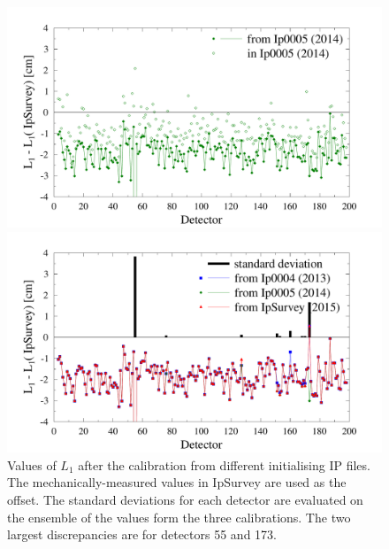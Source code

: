 \documentclass[11pt,a4paper,oneside]{article}
\begin{document}
\begin{figure}
\centering
\includegraphics[width=\textwidth]{img/L1_bis}

\includegraphics[width=\textwidth]{img/L1}
\caption{Values of $L_1$ after the calibration from different initialising IP files. The mechanically-measured values in IpSurvey are used as the offset. The standard deviations for each detector are evaluated on the ensemble of the values form the three calibrations. The two largest discrepancies are for detectors 55 and 173.}
\label{L1}
\end{figure}
\end{document}
